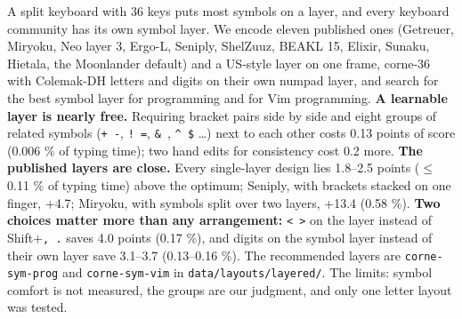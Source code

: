 \documentclass{gecko-paper}
\begin{document}
\makepapertitle
\begin{paperabstract}
A split keyboard with 36 keys puts most symbols on a layer, and every keyboard community has its own symbol layer. We encode eleven published ones (Getreuer, Miryoku, Neo layer 3, Ergo-L, Seniply, ShelZuuz, BEAKL 15, Elixir, Sunaku, Hietala, the Moonlander default) and a US-style layer on one frame, corne-36 with Colemak-DH letters and digits on their own numpad layer, and search for the best
symbol layer for programming and for Vim programming. \textbf{A learnable layer is nearly free.} Requiring bracket pairs side by side and eight groups of related symbols (\texttt{+\ -}, \texttt{!\ =}, \texttt{\&\ \textbar{}}, \texttt{\^{}\ \$} \ldots) next to each other costs 0.13 points of score (0.006 \% of typing time); two hand edits for consistency cost 0.2 more. \textbf{The published layers
are close.} Every single-layer design lies 1.8–2.5 points ($\leq$ 0.11 \% of typing time) above the optimum; Seniply, with brackets stacked on one finger, +4.7; Miryoku, with symbols split over two layers, +13.4 (0.58 \%). \textbf{Two choices matter more than any arrangement:} \texttt{\textless{}\ \textgreater{}} on the layer instead of Shift+\texttt{,\ .} saves 4.0 points (0.17 \%), and digits on the
symbol layer instead of their own layer save 3.1–3.7 (0.13–0.16 \%). The recommended layers are \texttt{corne-sym-prog} and \texttt{corne-sym-vim} in \texttt{data/layouts/layered/}. The limits: symbol comfort is not measured, the groups are our judgment, and only one letter layout was tested.

\end{paperabstract}
\raggedright
\end{document}
